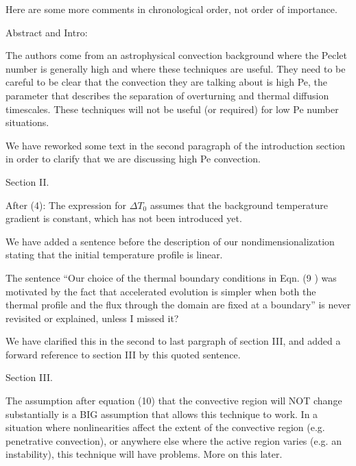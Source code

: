 \documentclass[aps, 11pt, singlecolumn]{revtex4-1} %
\begin{document}
\begin{singlespace}
\begin{myquotation}
Here are some more comments in chronological order, not order of
importance.

Abstract and Intro:

The authors come from an astrophysical convection background where the
Peclet number is generally high and where these techniques are useful.
They need to be careful to be clear that the convection they are
talking about is high Pe, the parameter that describes the separation
of overturning and thermal diffusion timescales. These techniques will
not be useful (or required) for low Pe number situations.
\end{myquotation}
We have reworked some text in the second paragraph of the introduction section
in order to clarify that we are discussing high Pe convection.

\begin{myquotation}
Section II.

After (4): The expression for $\Delta T_0$ assumes that the background
temperature gradient is constant, which has not been introduced yet.
\end{myquotation}
We have added a sentence before the description of our nondimensionalization
stating that the initial temperature profile is linear.

\begin{myquotation}
The sentence ``Our choice of the thermal boundary conditions in Eqn.
(9 ) was motivated by the fact that accelerated evolution is simpler
when both the thermal profile and the flux through the domain are
fixed at a boundary'' is never revisited or explained, unless I missed
it?
\end{myquotation}
We have clarified this in the second to last pargraph of section III,
and added a forward reference to section III by this quoted sentence. 

\begin{myquotation}
Section III.

The assumption after equation (10) that the convective region will NOT
change substantially is a BIG assumption that allows this technique to
work. In a situation where nonlinearities affect the extent of the
convective region (e.g. penetrative convection), or anywhere else
where the active region varies (e.g. an instability), this technique
will have problems. More on this later.


\end{myquotation}
\end{singlespace}
\end{document}
